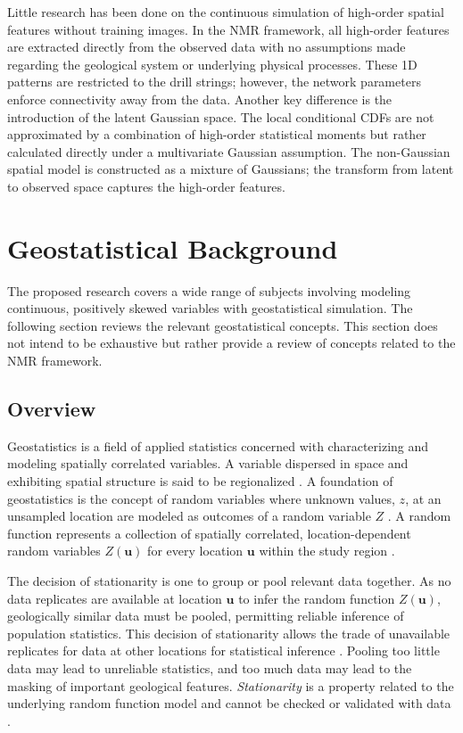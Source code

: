 Little research has been done on the continuous simulation of high-order spatial features without training images. In the \gls{NMR} framework, all high-order features are extracted directly from the observed data with no assumptions made regarding the geological system or underlying physical processes. These \gls{1D} patterns are restricted to the drill strings; however, the network parameters enforce connectivity away from the data. Another key difference is the introduction of the latent Gaussian space. The local conditional \glspl{CDF} are not approximated by a combination of high-order statistical moments but rather calculated directly under a multivariate Gaussian assumption. The non-Gaussian spatial model is constructed as a mixture of Gaussians; the transform from latent to observed space captures the high-order features.


\FloatBarrier
\section{Geostatistical Background}
\label{sec:01geostatreview}

The proposed research covers a wide range of subjects involving modeling continuous, positively skewed variables with geostatistical simulation. The following section reviews the relevant geostatistical concepts. This section does not intend to be exhaustive but rather provide a review of concepts related to the \gls{NMR} framework.

\subsection{Overview}
\label{subsec:01overview}

Geostatistics is a field of applied statistics concerned with characterizing and modeling spatially correlated variables. A variable dispersed in space and exhibiting spatial structure is said to be regionalized \citep{matheron2019matheron}. A foundation of geostatistics is the concept of random variables where unknown values, $z$, at an unsampled location are modeled as outcomes of a random variable $Z$ \citep{deutsch1992geostatistical}. A random function represents a collection of spatially correlated, location-dependent random variables $Z(\mathbf{u})$ for every location $\mathbf{u}$ within the study region \citep{goovaerts1997geostatistics}.

The decision of stationarity is one to group or pool relevant data together. As no data replicates are available at location $\mathbf{u}$ to infer the random function $Z(\mathbf{u})$, geologically similar data must be pooled, permitting reliable inference of population statistics. This decision of stationarity allows the trade of unavailable replicates for data at other locations for statistical inference \citep{deutsch1992geostatistical}. Pooling too little data may lead to unreliable statistics, and too much data may lead to the masking of important geological features. \textit{Stationarity} is a property related to the underlying random function model and cannot be checked or validated with data \citep{goovaerts1997geostatistics}.

